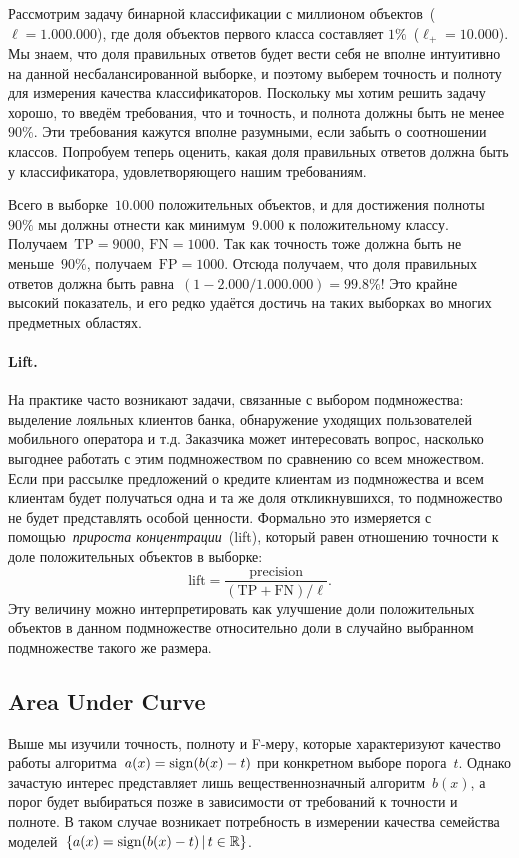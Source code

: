 \documentclass[12pt,fleqn]{article}
\begin{document}
Рассмотрим задачу бинарной классификации с миллионом объектов~($\ell = 1.000.000$),
где доля объектов первого класса составляет $1\%$~($\ell_+ = 10.000$).
Мы знаем, что доля правильных ответов будет вести себя не вполне интуитивно
на данной несбалансированной выборке, и поэтому выберем точность и полноту для измерения
качества классификаторов.
Поскольку мы хотим решить задачу хорошо, то введём требования, что и точность, и полнота
должны быть не менее~$90\%$.
Эти требования кажутся вполне разумными, если забыть о соотношении классов.
Попробуем теперь оценить, какая доля правильных ответов должна быть у классификатора,
удовлетворяющего нашим требованиям.

Всего в выборке~$10.000$ положительных объектов, и для достижения полноты~$90\%$
мы должны отнести как минимум~$9.000$ к положительному классу.
Получаем~$\text{TP} = 9000$, $\text{FN} = 1000$.
Так как точность тоже должна быть не меньше~$90\%$, получаем~$\text{FP} = 1000$.
Отсюда получаем, что доля правильных ответов должна быть равна~$(1 - 2.000/1.000.000) = 99.8\%$!
Это крайне высокий показатель, и его редко удаётся достичь на таких выборках во многих предметных областях.

\paragraph{Lift.}
На практике часто возникают задачи, связанные с выбором подмножества: выделение лояльных клиентов банка,
обнаружение уходящих пользователей мобильного оператора и т.д.
Заказчика может интересовать вопрос, насколько выгоднее работать с этим подмножеством
по сравнению со всем множеством.
Если при рассылке предложений о кредите клиентам из подмножества и всем клиентам
будет получаться одна и та же доля откликнувшихся, то подмножество не будет
представлять особой ценности.
Формально это измеряется с помощью~\emph{прироста концентрации}~(lift),
который равен отношению точности к доле положительных объектов в выборке:
\[
    \text{lift}
    =
    \frac{
        \text{precision}
    }{
        (\text{TP} + \text{FN}) / \ell
    }.
\]
Эту величину можно интерпретировать как улучшение доли положительных объектов
в данном подмножестве относительно доли в случайно выбранном подмножестве такого же размера.

\subsection{Area Under Curve}
Выше мы изучили точность, полноту и F-меру, которые характеризуют
качество работы алгоритма~$a(x) = \mathop{\rm sign}\limits(b(x) - t)$ при конкретном выборе порога~$t$.
Однако зачастую интерес представляет лишь вещественнозначный алгоритм~$b(x)$,
а порог будет выбираться позже в зависимости от требований к точности и полноте.
В таком случае возникает потребность
в измерении качества семейства моделей~$\{a(x) = \mathop{\rm sign}\limits(b(x) - t) \mspace{3mu}{|}\mspace{3mu} t \in \mathbb{R}\}$.
\end{document}
